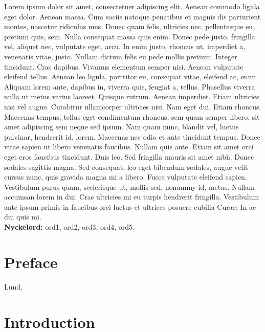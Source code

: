 \documentclass[a4paper,11pt]{article}
\begin{document}
  Lorem ipsum dolor sit amet, consectetuer adipiscing elit. Aenean commodo
  ligula eget dolor. Aenean massa. Cum sociis natoque penatibus et magnis dis
  parturient montes, nascetur ridiculus mus. Donec quam felis, ultricies nec,
  pellentesque eu, pretium quis, sem. Nulla consequat massa quis enim. Donec
  pede justo, fringilla vel, aliquet nec, vulputate eget, arcu. In enim justo,
  rhoncus ut, imperdiet a, venenatis vitae, justo. Nullam dictum felis eu pede
  mollis pretium. Integer tincidunt. Cras dapibus. Vivamus elementum semper
  nisi. Aenean vulputate eleifend tellus. Aenean leo ligula, porttitor eu,
  consequat vitae, eleifend ac, enim. Aliquam lorem ante, dapibus in, viverra
  quis, feugiat a, tellus. Phasellus viverra nulla ut metus varius laoreet.
  Quisque rutrum. Aenean imperdiet. Etiam ultricies nisi vel augue. Curabitur
  ullamcorper ultricies nisi. Nam eget dui. Etiam rhoncus. Maecenas tempus,
  tellus eget condimentum rhoncus, sem quam semper libero, sit amet adipiscing
  sem neque sed ipsum. Nam quam nunc, blandit vel, luctus pulvinar, hendrerit
  id, lorem. Maecenas nec odio et ante tincidunt tempus. Donec vitae sapien ut
  libero venenatis faucibus. Nullam quis ante. Etiam sit amet orci eget eros
  faucibus tincidunt. Duis leo. Sed fringilla mauris sit amet nibh. Donec
  sodales sagittis magna. Sed consequat, leo eget bibendum sodales, augue velit
  cursus nunc, quis gravida magna mi a libero. Fusce vulputate eleifend sapien.
  Vestibulum purus quam, scelerisque ut, mollis sed, nonummy id, metus. Nullam
  accumsan lorem in dui. Cras ultricies mi eu turpis hendrerit fringilla.
  Vestibulum ante ipsum primis in faucibus orci luctus et ultrices posuere
  cubilia Curae; In ac dui quis mi. \\

  \textbf{Nyckelord:} ord1, ord2, ord3, ord4, ord5.


\newpage

\section*{Preface}

{\large
Lund, \monthname \ \the\year
\vspace{0.7cm} \\
\name
}

\newpage

\tableofcontents

\newpage
{}

\section{Introduction}
\end{document}
